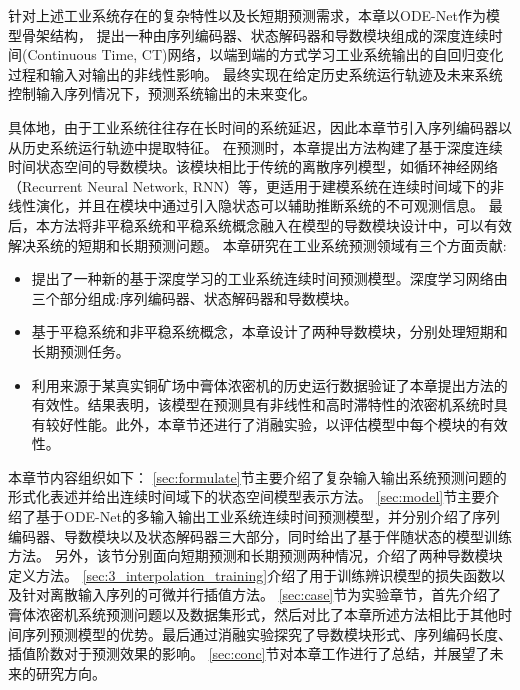 针对上述工业系统存在的复杂特性以及长短期预测需求，本章以ODE-Net作为模型骨架结构，
提出一种由序列编码器、状态解码器和导数模块组成的深度连续时间(Continuous Time, CT)网络，以端到端的方式学习工业系统输出的自回归变化过程和输入对输出的非线性影响。
最终实现在给定历史系统运行轨迹及未来系统控制输入序列情况下，预测系统输出的未来变化。

具体地，由于工业系统往往存在长时间的系统延迟，因此本章节引入序列编码器以从历史系统运行轨迹中提取特征。
在预测时，本章提出方法构建了基于深度连续时间状态空间的导数模块。该模块相比于传统的离散序列模型，如循环神经网络（Recurrent Neural Network, RNN）等，更适用于建模系统在连续时间域下的非线性演化，并且在模块中通过引入隐状态可以辅助推断系统的不可观测信息。
最后，本方法将非平稳系统和平稳系统概念融入在模型的导数模块设计中，可以有效解决系统的短期和长期预测问题。
本章研究在工业系统预测领域有三个方面贡献:
\begin{itemize}
\item 提出了一种新的基于深度学习的工业系统连续时间预测模型。深度学习网络由三个部分组成:序列编码器、状态解码器和导数模块。
\item 基于平稳系统和非平稳系统概念，本章设计了两种导数模块，分别处理短期和长期预测任务。
\item 利用来源于某真实铜矿场中膏体浓密机的历史运行数据验证了本章提出方法的有效性。结果表明，该模型在预测具有非线性和高时滞特性的浓密机系统时具有较好性能。此外，本章节还进行了消融实验，以评估模型中每个模块的有效性。
\end{itemize}

本章节内容组织如下：
\ref{sec:formulate}节主要介绍了复杂输入输出系统预测问题的形式化表述并给出连续时间域下的状态空间模型表示方法。
\ref{sec:model}节主要介绍了基于ODE-Net的多输入输出工业系统连续时间预测模型，并分别介绍了序列编码器、导数模块以及状态解码器三大部分，同时给出了基于伴随状态的模型训练方法。
另外，该节分别面向短期预测和长期预测两种情况，介绍了两种导数模块定义方法。
\ref{sec:3_interpolation_training}介绍了用于训练辨识模型的损失函数以及针对离散输入序列的可微并行插值方法。
\ref{sec:case}节为实验章节，首先介绍了膏体浓密机系统预测问题以及数据集形式，然后对比了本章所述方法相比于其他时间序列预测模型的优势。最后通过消融实验探究了导数模块形式、序列编码长度、插值阶数对于预测效果的影响。
\ref{sec:conc}节对本章工作进行了总结，并展望了未来的研究方向。

